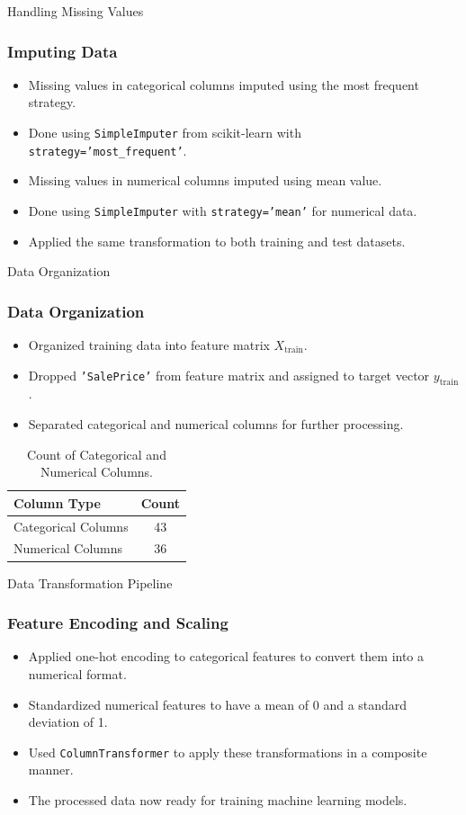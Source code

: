 \begin{frame}{Handling Missing Values}
    \frametitle{Imputing Data}
    \begin{itemize}
        \item Missing values in categorical columns imputed using the most frequent strategy.
        \item Done using \texttt{SimpleImputer} from scikit-learn with \texttt{strategy='most\_frequent'}.
        \item Missing values in numerical columns imputed using mean value.
        \item Done using \texttt{SimpleImputer} with \texttt{strategy='mean'} for numerical data.
        \item Applied the same transformation to both training and test datasets.
    \end{itemize}
\end{frame}

\begin{frame}{Data Organization}
    \frametitle{Data Organization}
    \begin{itemize}
        \item Organized training data into feature matrix \(X_{\text{train}}\).
        \item Dropped \texttt{'SalePrice'} from feature matrix and assigned to target vector \(y_{\text{train}}\).
        \item Separated categorical and numerical columns for further processing.
    \end{itemize}
    \begin{table}[H]
        \centering
        \small
        \begin{tabular}{|l|c|}
        \hline
        \textbf{Column Type} & \textbf{Count} \\
        \hline
        Categorical Columns & 43 \\
        Numerical Columns & 36 \\
        \hline
        \end{tabular}
        \caption{Count of Categorical and Numerical Columns.}
        \label{tab:column_counts}
    \end{table}
\end{frame}

\begin{frame}{Data Transformation Pipeline}
    \frametitle{Feature Encoding and Scaling}
    \begin{itemize}
        \item Applied one-hot encoding to categorical features to convert them into a numerical format.
        \item Standardized numerical features to have a mean of 0 and a standard deviation of 1.
        \item Used \texttt{ColumnTransformer} to apply these transformations in a composite manner.
        \item The processed data now ready for training machine learning models.
    \end{itemize}
\end{frame}

